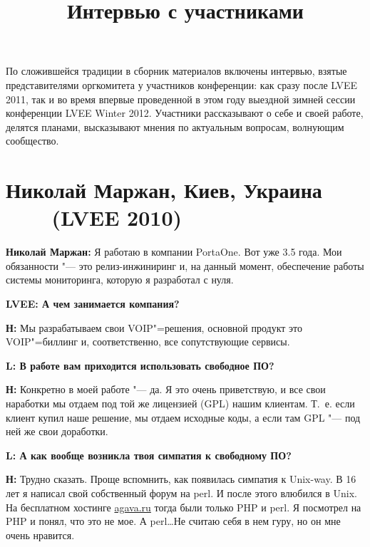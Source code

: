 \documentclass[10pt, a5paper]{article}
\begin{document}
\title{Интервью с участниками}
\date{}
\maketitle

По сложившейся традиции в сборник материалов включены интервью, взятые представителями оргкомитета у участников конференции: как сразу после LVEE 2011, так и во время впервые проведенной в этом году выездной зимней сессии конференции LVEE Winter 2012. Участники рассказывают о себе и своей работе, делятся планами, высказывают мнения по актуальным вопросам, волнующим сообщество. 

\section[Николай Маржан, Киев, Украина (LVEE 2010)]{Николай Маржан, Киев, Украина ~~~~\linebreak (LVEE 2010)}

{\noindent \bf Николай Маржан:} Я работаю в компании PortaOne. Вот уже 3.5 года. Мои обязанности "--- это релиз-инжиниринг и, на данный момент, обеспечение работы системы мониторинга, которую я разработал с нуля.

{\noindent \bf LVEE: А чем занимается компания?}

{\noindent \bf Н:} Мы разрабатываем свои VOIP"=решения, основной продукт это VOIP"=биллинг и, соответственно, все сопутствующие сервисы.

{\noindent \bf L: В работе вам приходится использовать свободное ПО?}

{\noindent \bf Н:} Конкретно в моей работе "--- да. Я это очень приветствую, и все свои наработки мы отдаем под той же лицензией (GPL) нашим клиентам. Т.~е. если клиент купил наше решение, мы отдаем исходные коды, а если там GPL "--- под ней же свои доработки.

{\noindent \bf L: А как вообще возникла твоя симпатия к свободному ПО?}

{\noindent \bf Н:} Трудно сказать. Проще вспомнить, как появилась симпатия к Unix-way. В 16 лет я написал свой собственный форум на perl. И после этого влюбился в Unix. 
На бесплатном хостинге \url{agava.ru} тогда были только PHP и perl. Я посмотрел на PHP и понял, что это не мое. А perl\ldots Не считаю себя в нем гуру, но он мне очень нравится. 
\end{document}
